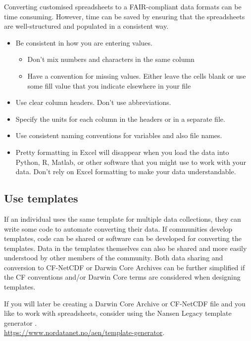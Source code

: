 \documentclass[a4paper,12pt]{article}
\begin{document}
Converting customised spreadsheets to a FAIR-compliant data formats can be time consuming. However, time can be saved by ensuring that the spreadsheets are well-structured and populated in a consistent way.

\begin{itemize}
\item Be consistent in how you are entering values.
\begin{itemize}
\item Don't mix numbers and characters in the same column
\item Have a convention for missing values. Either leave the cells blank or use some fill value that you indicate elsewhere in your file
\end{itemize}
\item Use clear column headers. Don't use abbreviations.
\item Specify the units for each column in the headers or in a separate file.
\item Use consistent naming conventions for variables and also file names.
\item Pretty formatting in Excel will disappear when you load the data into Python, R, Matlab, or other software that you might use to work with your data. Don't rely on Excel formatting to make your data understandable.
\end{itemize}

\subsection{Use templates}

If an individual uses the same template for multiple data collections, they can write some code to automate converting their data. If communities develop templates, code can be shared or software can be developed for converting the templates. Data in the templates themselves can also be shared and more easily understood by other members of the community. Both data sharing and conversion to CF-NetCDF or Darwin Core Archives can be further simplified if the CF conventions and/or Darwin Core terms are considered when designing templates.

If you will later be creating a Darwin Core Archive or CF-NetCDF file and you like to work with spreadsheets, consider using the Nansen Legacy template generator \citep{template_generator}.\\
\url{https://www.nordatanet.no/aen/template-generator}.\\
\end{document}

